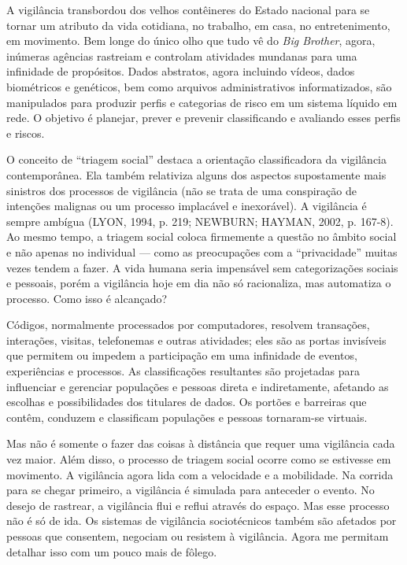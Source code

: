 A vigilância transbordou dos velhos contêineres do Estado nacional para
se tornar um atributo da vida cotidiana, no trabalho, em casa, no
entretenimento, em movimento. Bem longe do único olho que tudo vê do
\emph{Big Brother}, agora, inúmeras agências rastreiam e controlam
atividades mundanas para uma infinidade de propósitos. Dados abstratos,
agora incluindo vídeos, dados biométricos e genéticos, bem como arquivos
administrativos informatizados, são manipulados para produzir perfis e
categorias de risco em um sistema líquido em rede. O objetivo é
planejar, prever e prevenir classificando e avaliando esses perfis e
riscos.

O conceito de ``triagem social'' destaca a orientação classificadora da
vigilância contemporânea. Ela também relativiza alguns dos aspectos
supostamente mais sinistros dos processos de vigilância (não se trata de
uma conspiração de intenções malignas ou um processo implacável e
inexorável). A vigilância é sempre ambígua (LYON, 1994, p. 219; NEWBURN;
HAYMAN, 2002, p. 167-8). Ao mesmo tempo, a triagem social coloca
firmemente a questão no âmbito social e não apenas no individual ---
como as preocupações com a ``privacidade'' muitas vezes tendem a fazer.
A vida humana seria impensável sem categorizações sociais e pessoais,
porém a vigilância hoje em dia não só racionaliza, mas automatiza o
processo. Como isso é alcançado?

Códigos, normalmente processados por computadores, resolvem transações,
interações, visitas, telefonemas e outras atividades; eles são as portas
invisíveis que permitem ou impedem a participação em uma infinidade de
eventos, experiências e processos. As classificações resultantes são
projetadas para influenciar e gerenciar populações e pessoas direta e
indiretamente, afetando as escolhas e possibilidades dos titulares de
dados. Os portões e barreiras que contêm, conduzem e classificam
populações e pessoas tornaram-se virtuais.

Mas não é somente o fazer das coisas à distância que requer uma
vigilância cada vez maior. Além disso, o processo de triagem social
ocorre como se estivesse em movimento. A vigilância agora lida com a
velocidade e a mobilidade. Na corrida para se chegar primeiro, a
vigilância é simulada para anteceder o evento. No desejo de rastrear, a
vigilância flui e reflui através do espaço. Mas esse processo não é só
de ida. Os sistemas de vigilância sociotécnicos também são afetados por
pessoas que consentem, negociam ou resistem à vigilância. Agora me
permitam detalhar isso com um pouco mais de fôlego.

